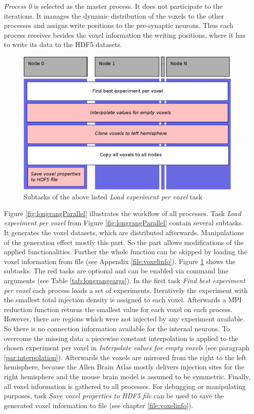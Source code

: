 \emph{Process 0} is selected as the master process. It does not participate to the iterations.
It manages the dynamic distribution of the voxels to the other processes and 
assigns write positions to the pre-synaptic neurons. Thus each process receives besides the 
voxel information the writing positions,
where it has to write its data to the HDF5 datasets.
\begin{figure}[ht!]
\centering
\includegraphics[scale=0.5]{pictures/longRange_BestExp_parallelAlg.eps}
\caption{Subtasks of the above listed \emph{Load experiment per voxel} task}
\label{fig:longrangeLEPV}
\end{figure}

Figure \ref{fig:longrangParallel} illustrates the workflow of all processes.
Task \emph{Load experiment per voxel} from Figure \ref{fig:longrangParallel} contain several subtasks.
It generates the voxel datasets, which are distributed afterwards.
Manipulations of the generation effect mostly this part.
So the part allows modifications of the applied functionalities. 
Further the whole function can be skipped by loading the voxel information from file (see Appendix \ref{file:voxelinfo}).
Figure \ref{fig:longrangeLEPV} shows the subtasks.
The red tasks are optional and can be enabled via command line arguments (see Table \ref{tab:longrangeargs}).
In the first task \emph{Find best experiment per voxel} each process loads a set of experiments.
Iteratively the experiment with the smallest total injection density is assigned to each voxel.
Afterwards a MPI reduction function returns the smallest value for each voxel on
each process.
However, there are regions which were not injected by any experiment available.
So there is no connection information available for the internal neurons.
To overcome the missing data a piecewise constant interpolation is applied to the chosen experiment per voxel
in \emph{Interpolate values for empty voxels} (see paragraph \ref{par:interpolation}).
Afterwards the voxels are mirrored from the right to the left hemisphere, because the
Allen Brain Atlas mostly delivers injection sites for the right hemisphere and
the mouse brain model is assumed to be symmetric.
Finally, all voxel information is gathered to all processes.
For debugging or manipulating purposes, task \emph{Save voxel properties to HDF5 file} can be used
to save the generated voxel information to file (see chapter \ref{file:voxelinfo}).

